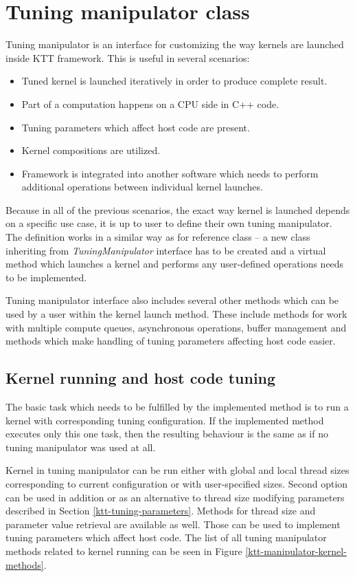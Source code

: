 \documentclass
[
    digital, %
    oneside, %
    table, %
    nolof, %
    nolot, %
    nocover %
]{fithesis3}
\begin{document}
\section{Tuning manipulator class}
\label{ktt-manipulator}
Tuning manipulator is an interface for customizing the way kernels are launched inside KTT framework. This is useful in several scenarios:
\begin{itemize}
    \item Tuned kernel is launched iteratively in order to produce complete result.
    \item Part of a computation happens on a CPU side in C++ code.
    \item Tuning parameters which affect host code are present.
    \item Kernel compositions are utilized.
    \item Framework is integrated into another software which needs to perform additional operations between individual kernel launches.
\end{itemize}

Because in all of the previous scenarios, the exact way kernel is launched depends on a specific use case, it is up to user to define their own tuning
manipulator. The definition works in a similar way as for reference class -- a new class inheriting from \textit{TuningManipulator} interface has to be
created and a virtual method which launches a kernel and performs any user-defined operations needs to be implemented.

Tuning manipulator interface also includes several other methods which can be used by a user within the kernel launch method. These include methods
for work with multiple compute queues, asynchronous operations, buffer management and methods which make handling of tuning parameters affecting
host code easier.

\subsection{Kernel running and host code tuning}
The basic task which needs to be fulfilled by the implemented method is to run a kernel with corresponding tuning configuration. If the implemented
method executes only this one task, then the resulting behaviour is the same as if no tuning manipulator was used at all.

Kernel in tuning manipulator can be run either with global and local thread sizes corresponding to current configuration or with user-specified sizes.
Second option can be used in addition or as an alternative to thread size modifying parameters described in Section \ref{ktt-tuning-parameters}.
Methods for thread size and parameter value retrieval are available as well. Those can be used to implement tuning parameters which affect host code.
The list of all tuning manipulator methods related to kernel running can be seen in Figure \ref{ktt-manipulator-kernel-methods}.
\end{document}
